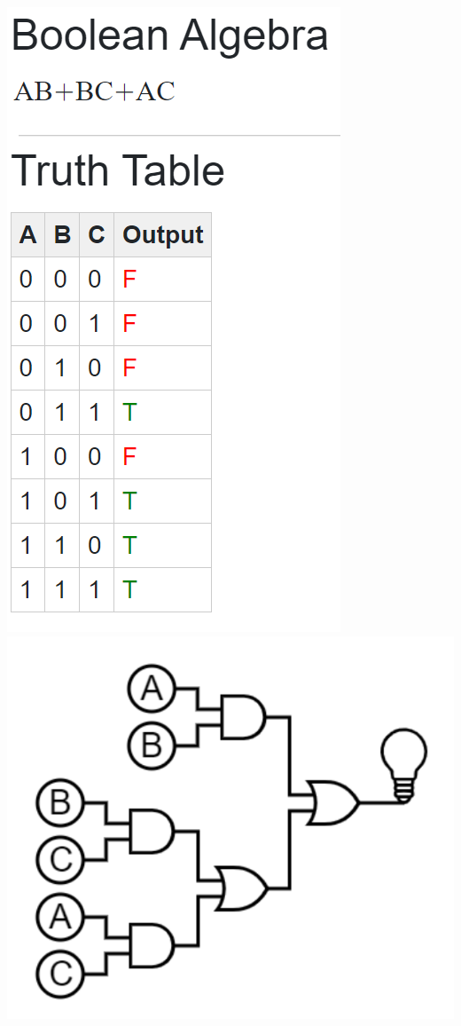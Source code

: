 \documentclass[10pt]{article}
\begin{document}
\begin{itemize}
\begin{enumerate}
\includegraphics[scale=.6]{Problem8algebra.png}
\includegraphics[scale=.6]{Problem8circuit.png}


\end{enumerate}
\end{itemize}
\end{document}
